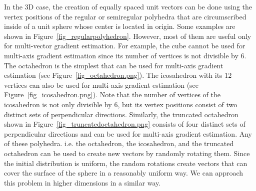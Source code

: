 \documentclass{article}
\begin{document}
In the 3D case, the creation of equally spaced unit vectors can be done using the vertex positions of the regular or semiregular polyhedra that are circumscribed inside of a unit sphere whose center is located in origin. Some examples are shown in Figure~\ref{fig_regularpolyhedron}. However, most of them are useful only for multi-vector gradient estimation. For example, the cube cannot be used for multi-axis gradient estimation since its number of vertices is not divisible by $6$. 
The octahedron is the simplest that can be used for multi-axis gradient estimation (see Figure~\ref{fig_octahedron.png}). The icosahedron with its $12$ vertices can also be used for multi-axis gradient estimation (see Figure~\ref{fig_icosahedron.png}). Note that the number of vertices of the icosahedron is not only divisible by $6$, but its vertex positions consist of two distinct sets of perpendicular directions. Similarly, the truncated octahedron shown in Figure~\ref{fig_truncatedoctahedron.png} consists of four distinct sets of perpendicular directions and can be used for multi-axis gradient estimation. Any of these polyhedra. i.e. the octahedron, the icosahedron, and the truncated octahedron can be used to create new vectors by randomly rotating them. Since the initial distribution is uniform, the random rotations create vectors that can cover the surface of the sphere in a reasonably uniform way. We can approach this problem in higher dimensions in a similar way. 
\end{document}

